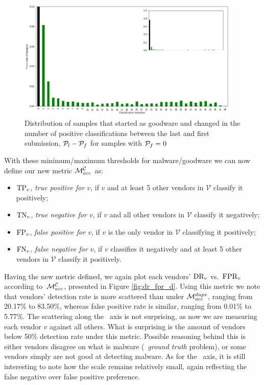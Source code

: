 \begin{figure}[!htb]
	\centering
	\includegraphics[width=0.95\textwidth]{Figures/distribution_clean.png}
	\caption[Distribution of duplicated samples with $\Pf=0$.]{Distribution of samples that started as goodware and changed in the number of positive classifications between the last and first submission, \ie $\mathcal{P}_{l}-\mathcal{P}_{f}$ for samples with $\Pf=0$}
	\label{fig:distribution_clean}
\end{figure}

With these minimum/maximum thresholds for malware/goodware we can now define our new metric $\mathcal{M}_{acc}^{\mathcal{C}}$ as:

\begin{itemize}
	\item $\textrm{TP}_v$, \emph{true positive for $v$}, if $v$ and at least 5 other vendors in $\mathcal{V}$ classify it positively;
	\item $\textrm{TN}_v$, \emph{true negative for $v$}, if $v$ and all other vendors in $\mathcal{V}$ classify it negatively;
	\item $\textrm{FP}_v$, \emph{false positive for $v$}, if $v$ is the only vendor in $\mathcal{V}$ classifying it positively;
	\item $\textrm{FN}_v$, \emph{false negative for $v$}, if $v$ classifies it negatively and at least 5 other vendors in $\mathcal{V}$ classify it positively.
\end{itemize}

Having the new metric defined, we again plot each vendors' $\textrm{DR}_v$ vs.\ $\textrm{FPR}_v$ according to~$\mathcal{M}_{acc}^{\mathcal{C}}$, presented in Figure \ref{fig:dr_fpr_d}.
Using this metric we note that vendors' detection rate is more scattered than under $\mathcal{M}_{acc}^{{dups}}$, ranging from 20.17\% to 83.50\%, whereas false positive rate is similar, ranging from 0.01\% to 5.77\%.
The scattering along the \tpr\ axis is not surprising, as now we are measuring each vendor $v$ against all others.
What is surprising is the amount of vendors below 50\% detection rate under this metric.
Possible reasoning behind this is either vendors disagree on what is malware (\ie\ \textit{ground truth} problem), or some vendors simply are not good at detecting malware.
As for the \fpr\ axis, it is still interesting to note how the scale remains relatively small, again reflecting the false negative over false positive preference.

